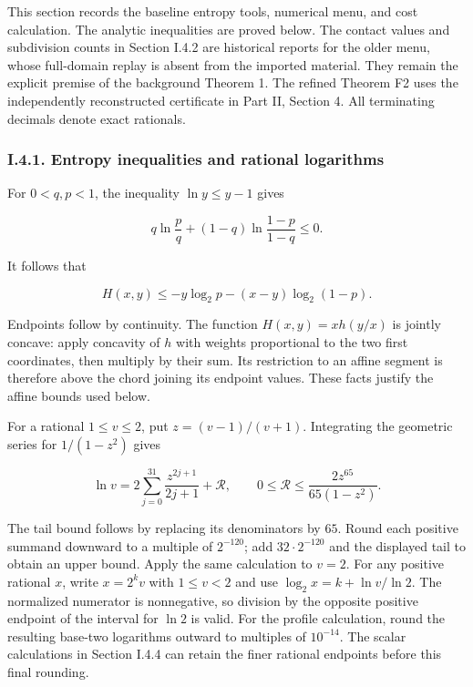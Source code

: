 This section records the baseline entropy tools, numerical menu, and cost calculation. The analytic inequalities are proved below. The contact values and subdivision counts in Section I.4.2 are historical reports for the older menu, whose full-domain replay is absent from the imported material. They remain the explicit premise of the background Theorem 1. The refined Theorem F2 uses the independently reconstructed certificate in Part II, Section 4. All terminating decimals denote exact rationals.

\hypertarget{af-a9ec399514-i.4.1.-entropy-inequalities-and-rational-logarithms}{%
\subsubsection{I.4.1. Entropy inequalities and rational logarithms}\label{af-a9ec399514-i.4.1.-entropy-inequalities-and-rational-logarithms}}

For \(0<q,p<1\), the inequality \(\ln y\le y-1\) gives

\[
q\ln\frac pq+(1-q)\ln\frac{1-p}{1-q}\le0.
\]

It follows that

\[
H(x,y)\le-y\log_2p-(x-y)\log_2(1-p).
\]

Endpoints follow by continuity. The function \(H(x,y)=xh(y/x)\) is jointly concave: apply concavity of \(h\) with weights proportional to the two first coordinates, then multiply by their sum. Its restriction to an affine segment is therefore above the chord joining its endpoint values. These facts justify the affine bounds used below.

For a rational \(1\le v\le2\), put \(z=(v-1)/(v+1)\). Integrating the geometric series for \(1/(1-z^2)\) gives

\[
\ln v=2\sum_{j=0}^{31}\frac{z^{2j+1}}{2j+1}+\mathcal R,
\qquad
0\le\mathcal R\le\frac{2z^{65}}{65(1-z^2)}.
\]

The tail bound follows by replacing its denominators by \(65\). Round each positive summand downward to a multiple of \(2^{-120}\); add \(32\cdot2^{-120}\) and the displayed tail to obtain an upper bound. Apply the same calculation to \(v=2\). For any positive rational \(x\), write \(x=2^k v\) with \(1\le v<2\) and use \(\log_2x=k+\ln v/\ln2\). The normalized numerator is nonnegative, so division by the opposite positive endpoint of the interval for \(\ln2\) is valid. For the profile calculation, round the resulting base-two logarithms outward to multiples of \(10^{-14}\). The scalar calculations in Section I.4.4 can retain the finer rational endpoints before this final rounding.

